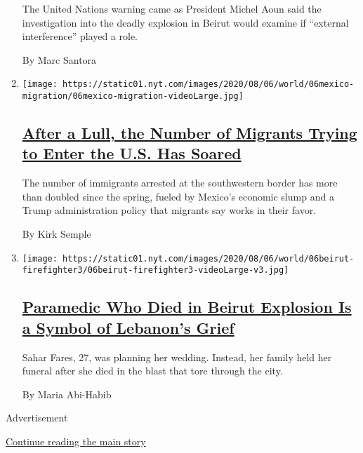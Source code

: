 \begin{enumerate}
  The United Nations warning came as President Michel Aoun said the
  investigation into the deadly explosion in Beirut would examine if
  ``external interference'' played a role.

  By Marc Santora
\item
  \texttt{[image: https://static01.nyt.com/images/2020/08/06/world/06mexico-migration/06mexico-migration-videoLarge.jpg]}

  \hypertarget{after-a-lull-the-number-of-migrants-trying-to-enter-the-us-has-soared}{%
  \subsection{\texorpdfstring{\href{/2020/08/06/world/americas/mexico-immigration-usa.html}{After
  a Lull, the Number of Migrants Trying to Enter the U.S. Has
  Soared}}{After a Lull, the Number of Migrants Trying to Enter the U.S. Has Soared}}\label{after-a-lull-the-number-of-migrants-trying-to-enter-the-us-has-soared}}

  The number of immigrants arrested at the southwestern border has more
  than doubled since the spring, fueled by Mexico's economic slump and a
  Trump administration policy that migrants say works in their favor.

  By Kirk Semple
\item
  \texttt{[image: https://static01.nyt.com/images/2020/08/06/world/06beirut-firefighter3/06beirut-firefighter3-videoLarge-v3.jpg]}

  \hypertarget{paramedic-who-died-in-beirut-explosion-is-a-symbol-of-lebanons-grief}{%
  \subsection{\texorpdfstring{\href{/2020/08/06/world/middleeast/Beirut-explosion-paramedic-Fares.html}{Paramedic
  Who Died in Beirut Explosion Is a Symbol of Lebanon's
  Grief}}{Paramedic Who Died in Beirut Explosion Is a Symbol of Lebanon's Grief}}\label{paramedic-who-died-in-beirut-explosion-is-a-symbol-of-lebanons-grief}}

  Sahar Fares, 27, was planning her wedding. Instead, her family held
  her funeral after she died in the blast that tore through the city.

  By Maria Abi-Habib
\end{enumerate}

Advertisement

\protect\hyperlink{after-mid1}{Continue reading the main story}

